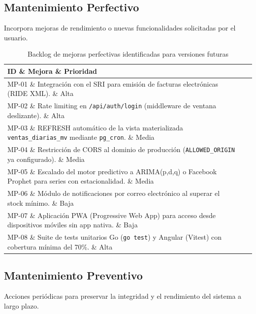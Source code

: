 \documentclass[12pt,a4paper,oneside]{report}
\begin{document}
\subsection{Mantenimiento Perfectivo}

Incorpora mejoras de rendimiento o nuevas funcionalidades solicitadas por el usuario.

\begin{table}[H]
\centering
\caption{Backlog de mejoras perfectivas identificadas para versiones futuras}
\begin{tabularx}{\textwidth}{|l|X|l|}
\hline
\rowcolor{lightgray}
\textbf{ID} \& \textbf{Mejora} \& \textbf{Prioridad} \\
\hline
MP-01 \& Integración con el SRI para emisión de facturas electrónicas (RIDE XML). \& Alta \\
\hline
MP-02 \& Rate limiting en \texttt{/api/auth/login} (middleware de ventana deslizante). \& Alta \\
\hline
MP-03 \& REFRESH automático de la vista materializada \texttt{ventas\_diarias\_mv} mediante \texttt{pg\_cron}. \& Media \\
\hline
MP-04 \& Restricción de CORS al dominio de producción (\texttt{ALLOWED\_ORIGIN} ya configurado). \& Media \\
\hline
MP-05 \& Escalado del motor predictivo a ARIMA(p,d,q) o Facebook Prophet para series con estacionalidad. \& Media \\
\hline
MP-06 \& Módulo de notificaciones por correo electrónico al superar el stock mínimo. \& Baja \\
\hline
MP-07 \& Aplicación PWA (Progressive Web App) para acceso desde dispositivos móviles sin app nativa. \& Baja \\
\hline
MP-08 \& Suite de tests unitarios Go (\texttt{go test}) y Angular (Vitest) con cobertura mínima del 70\%. \& Alta \\
\hline
\end{tabularx}
\label{tab:backlog-perfectivo}
\end{table}

\subsection{Mantenimiento Preventivo}

Acciones periódicas para preservar la integridad y el rendimiento del sistema a largo plazo.
\end{document}
